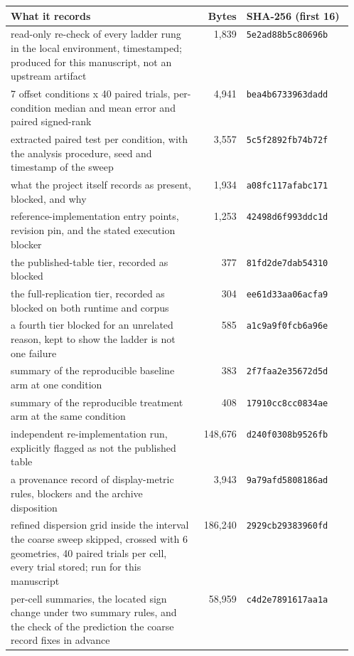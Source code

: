\begingroup
\setlength{\tabcolsep}{5pt}
\begin{tabular}{@{}p{0.56\linewidth}rl@{}}
\toprule
What it records & Bytes & SHA-256 (first 16) \\
\midrule
read-only re-check of every ladder rung in the local environment, timestamped; produced for this manuscript, not an upstream artifact &     1,839 & \texttt{5e2ad88b5c80696b} \\
7 offset conditions x 40 paired trials, per-condition median and mean error and paired signed-rank &     4,941 & \texttt{bea4b6733963dadd} \\
extracted paired test per condition, with the analysis procedure, seed and timestamp of the sweep &     3,557 & \texttt{5c5f2892fb74b72f} \\
what the project itself records as present, blocked, and why &     1,934 & \texttt{a08fc117afabc171} \\
reference-implementation entry points, revision pin, and the stated execution blocker &     1,253 & \texttt{42498d6f993ddc1d} \\
the published-table tier, recorded as blocked &       377 & \texttt{81fd2de7dab54310} \\
the full-replication tier, recorded as blocked on both runtime and corpus &       304 & \texttt{ee61d33aa06acfa9} \\
a fourth tier blocked for an unrelated reason, kept to show the ladder is not one failure &       585 & \texttt{a1c9a9f0fcb6a96e} \\
summary of the reproducible baseline arm at one condition &       383 & \texttt{2f7faa2e35672d5d} \\
summary of the reproducible treatment arm at the same condition &       408 & \texttt{17910cc8cc0834ae} \\
independent re-implementation run, explicitly flagged as not the published table &   148,676 & \texttt{d240f0308b9526fb} \\
a provenance record of display-metric rules, blockers and the archive disposition &     3,943 & \texttt{9a79afd5808186ad} \\
refined dispersion grid inside the interval the coarse sweep skipped, crossed with 6 geometries, 40 paired trials per cell, every trial stored; run for this manuscript &   186,240 & \texttt{2929cb29383960fd} \\
per-cell summaries, the located sign change under two summary rules, and the check of the prediction the coarse record fixes in advance &    58,959 & \texttt{c4d2e7891617aa1a} \\

\end{tabular}
